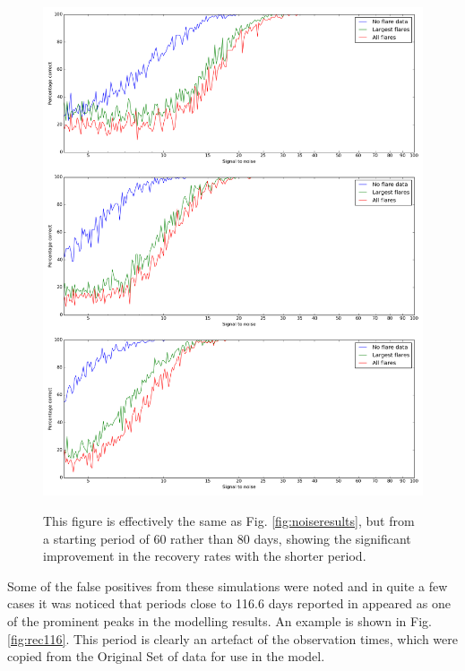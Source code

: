 \begin{figure}[!htbp]
\begin{center}
\includegraphics[scale=0.25]{Figures/Np60.png} \\
\end{center}
\caption{This figure is effectively the same as Fig. \ref{fig:noiseresults}, but from a starting period of 60 rather
  than 80 days, showing the significant improvement in the recovery rates with the shorter period.}
\protect\label{fig:noiseresults60}
\end{figure}

Some of the false positives from these simulations were noted and in quite a few cases it was noticed that periods close
to 116.6 days reported in \citet[Table 3]{suarezmascareno15} appeared as one of the prominent peaks in the modelling
results. An example is shown in Fig. \ref{fig:rec116}. This period is clearly an artefact of the observation times,
which were copied from the Original Set of {\harps} data for use in the model.

